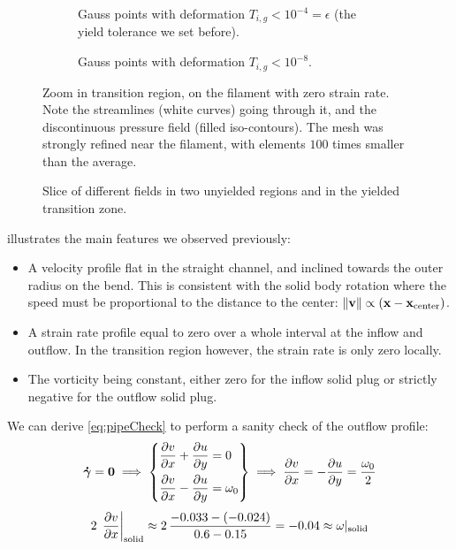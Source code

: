 \documentclass[11 pt]{report}
\begin{document}
\begin{figure}[!b]
    \centering
    \begin{subfigure}[t]{\textwidth}
        
        \caption{Gauss points with deformation $T_{i,g} < 10^{-4} = \epsilon$ (the yield tolerance we set before).}
        \label{fig:pipeFilament1}
    \end{subfigure}\vspace{10pt}
    \begin{subfigure}[t]{\textwidth}
        
        \caption{Gauss points with deformation $T_{i,g} < 10^{-8}$.}
        \label{fig:pipeFilament2}
    \end{subfigure}
    \caption{Zoom in transition region, on the filament with zero strain rate. Note the streamlines (white curves) going through it, and the discontinuous pressure field (filled iso-contours). The mesh was strongly refined near the filament, with elements $100$ times smaller than the average.}
    \label{fig:pipeFilament}
\end{figure}

\begin{figure}[t]
    \centering
    
    \caption{Slice of different fields in two unyielded regions and in the yielded transition zone.}
    \label{fig:pipeProfiles}
\end{figure}

 illustrates the main features we observed previously:
\begin{itemize}
    \item A velocity profile flat in the straight channel, and inclined towards the outer radius on the bend. This is consistent with the solid body rotation where the speed must be proportional to the distance to the center: $\|\mathbf{v}\| \propto (\mathbf{x}-\mathbf{x}_{\text{center}})$.
    \item A strain rate profile equal to zero over a whole interval at the inflow and outflow. In the transition region however, the strain rate is only zero locally.
    \item The vorticity being constant, either zero for the inflow solid plug or strictly negative for the outflow solid plug.
\end{itemize}

We can derive \cref{eq:pipeCheck} to perform a sanity check of the outflow profile:
\begin{equation}
    \boldsymbol{\dot \gamma}=\mathbf{0} \implies 
    \left\{\begin{aligned}
        &\pdv{v}{x} + \pdv{u}{y} = 0\\
        &\pdv{v}{x} - \pdv{u}{y} = \omega_0\\
    \end{aligned}\right\}
    \implies \pdv{v}{x} = -\pdv{u}{y} = \frac{\omega_0}{2}
    \label{eq:pipeCheck}
\end{equation}
\begin{equation}
    2\,\left.\pdv{v}{x}\right\vert_{\text{solid}} \approx 2\,\frac{-0.033 - (-0.024)}{0.6-0.15} = -0.04 \approx \omega\vert_{\text{solid}}
\end{equation}
\end{document}
